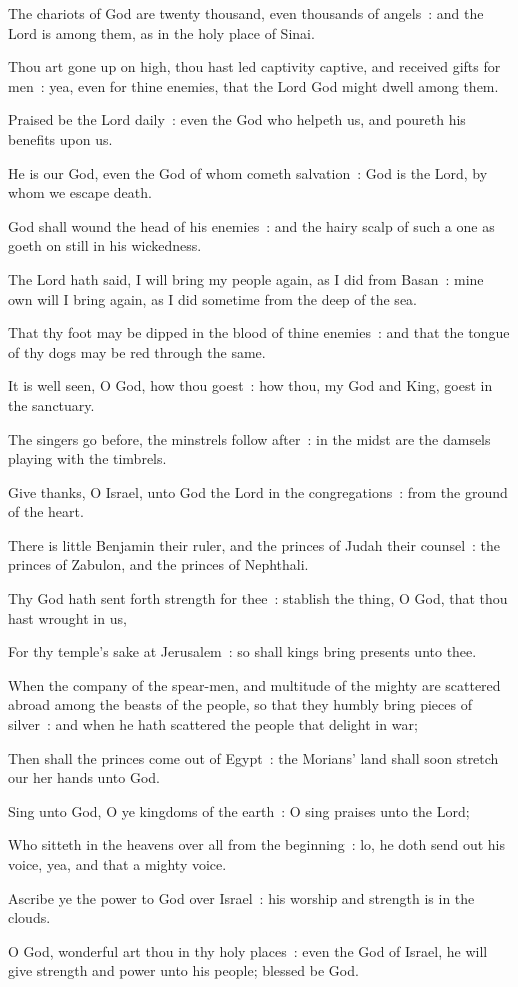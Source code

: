 The chariots of God are twenty thousand, even thousands of angels~: and the Lord is among them, as in the holy place of Sinai.\par
{}Thou art gone up on high, thou hast led captivity captive, and received gifts for men~: yea, even for thine enemies, that the Lord God might dwell among them.\par
{}Praised be the Lord daily~: even the God who helpeth us, and poureth his benefits upon us.\par
{}He is our God, even the God of whom cometh salvation~: God is the Lord, by whom we escape death.\par
{}God shall wound the head of his enemies~: and the hairy scalp of such a one as goeth on still in his wickedness.\par
{}The Lord hath said, I will bring my people again, as I did from Basan~: mine own will I bring again, as I did sometime from the deep of the sea.\par
{}That thy foot may be dipped in the blood of thine enemies~: and that the tongue of thy dogs may be red through the same.\par
{}It is well seen, O God, how thou goest~: how thou, my God and King, goest in the sanctuary.\par
{}The singers go before, the minstrels follow after~: in the midst are the damsels playing with the timbrels.\par
{}Give thanks, O Israel, unto God the Lord in the congregations~: from the ground of the heart.\par
{}There is little Benjamin their ruler, and the princes of Judah their counsel~: the princes of Zabulon, and the princes of Nephthali.\par
{}Thy God hath sent forth strength for thee~: stablish the thing, O God, that thou hast wrought in us,\par
{}For thy temple's sake at Jerusalem~: so shall kings bring presents unto thee.\par
{}When the company of the spear-men, and multitude of the mighty are scattered abroad among the beasts of the people, so that they humbly bring pieces of silver~: and when he hath scattered the people that delight in war;\par
{}Then shall the princes come out of Egypt~: the Morians' land shall soon stretch our her hands unto God.\par
{}Sing unto God, O ye kingdoms of the earth~: O sing praises unto the Lord;\par
{}Who sitteth in the heavens over all from the beginning~: lo, he doth send out his voice, yea, and that a mighty voice.\par
{}Ascribe ye the power to God over Israel~: his worship and strength is in the clouds.\par
{}O God, wonderful art thou in thy holy places~: even the God of Israel, he will give strength and power unto his people; blessed be God.\par

